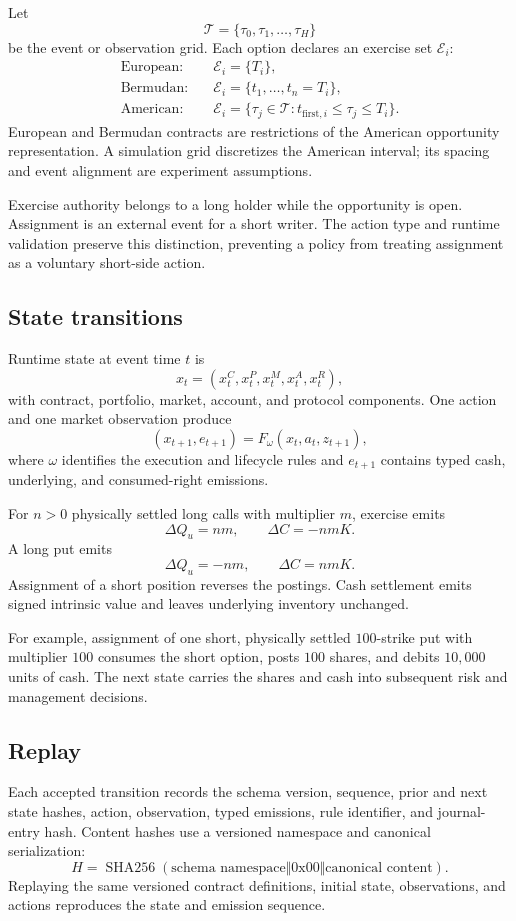 \documentclass{strategynet-journal}
\begin{document}
\begin{SNcolumns}
Let
\[
  \mathcal T=\{\tau_0,\tau_1,\ldots,\tau_H\}
\]
be the event or observation grid.  Each option declares an exercise set
\(\mathcal E_i\):
\[
\begin{aligned}
  \text{European:}\quad&
    \mathcal E_i=\{T_i\},\\
  \text{Bermudan:}\quad&
    \mathcal E_i=\{t_1,\ldots,t_n=T_i\},\\
  \text{American:}\quad&
    \mathcal E_i=\{\tau_j\in\mathcal T:
      t_{\mathrm{first},i}\leq\tau_j\leq T_i\}.
\end{aligned}
\]
European and Bermudan contracts are restrictions of the American opportunity
representation.  A simulation grid discretizes the American interval; its
spacing and event alignment are experiment assumptions.

Exercise authority belongs to a long holder while the opportunity is open.
Assignment is an external event for a short writer.  The action type and
runtime validation preserve this distinction, preventing a policy from
treating assignment as a voluntary short-side action.

\subsection{State transitions}

Runtime state at event time \(t\) is
\[
  x_t=(x_t^{C},x_t^{P},x_t^{M},x_t^{A},x_t^{R}),
\]
with contract, portfolio, market, account, and protocol components.  One
action and one market observation produce
\[
  (x_{t+1},e_{t+1})
  =F_{\omega}(x_t,a_t,z_{t+1}),
\]
where \(\omega\) identifies the execution and lifecycle rules and
\(e_{t+1}\) contains typed cash, underlying, and consumed-right emissions.

For \(n>0\) physically settled long calls with multiplier \(m\), exercise
emits
\[
  \Delta Q_u=nm,\qquad \Delta C=-nmK.
\]
A long put emits
\[
  \Delta Q_u=-nm,\qquad \Delta C=nmK.
\]
Assignment of a short position reverses the postings.  Cash settlement emits
signed intrinsic value and leaves underlying inventory unchanged.

For example, assignment of one short, physically settled \(100\)-strike put
with multiplier \(100\) consumes the short option, posts \(100\) shares, and
debits \(10{,}000\) units of cash.  The next state carries the shares and cash
into subsequent risk and management decisions.

\subsection{Replay}

Each accepted transition records the schema version, sequence, prior and next
state hashes, action, observation, typed emissions, rule identifier, and
journal-entry hash.  Content hashes use a versioned namespace and canonical
serialization:
\[
  H=\operatorname{SHA256}(
    \text{schema namespace}\Vert0\mathrm{x}00
    \Vert\text{canonical content}).
\]
Replaying the same versioned contract definitions, initial state,
observations, and actions reproduces the state and emission sequence.

\end{SNcolumns}
\end{document}
